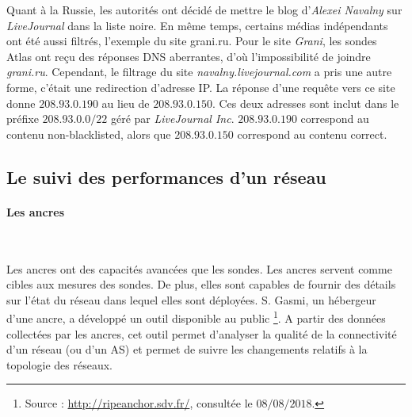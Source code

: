 Quant à la Russie, les autorités ont décidé de mettre le blog d'\textit{Alexei Navalny} sur  \textit{LiveJournal}  dans la liste noire. En même temps, certains médias indépendants ont été aussi filtrés, l'exemple du site grani.ru.  Pour le site  \textit{Grani}, les sondes Atlas ont reçu des réponses DNS aberrantes, d'où l'impossibilité de joindre   \textit{grani.ru}. Cependant, le filtrage du site \textit{navalny.livejournal.com}  a pris une autre forme, c'était une redirection d'adresse IP. La réponse d'une requête vers ce site donne $208.93.0.190$  au lieu de $ 208.93.0.150$. Ces deux adresses sont inclut dans le préfixe $208.93.0.0/22$ géré par \textit{LiveJournal Inc}. 
$208.93.0.190$  correspond au contenu  non-blacklisted, alors que  $ 208.93.0.150$ correspond au contenu correct.

\subsection{Le suivi des performances d'un réseau}
\paragraph{Les ancres}~

Les ancres  ont des capacités avancées que les sondes. Les ancres servent comme cibles aux mesures des sondes. De plus, elles sont capables de fournir des détails sur l'état du réseau dans lequel elles sont déployées.  S. Gasmi, un hébergeur d'une ancre, a développé un outil  disponible au public \footnote{Source : \url{http://ripeanchor.sdv.fr/}, consultée le $08/08/2018$.}. 
A partir des données collectées par les ancres, cet outil permet d'analyser  la qualité de la connectivité d'un réseau (ou d'un AS) et permet de suivre les changements relatifs à la topologie des réseaux.

